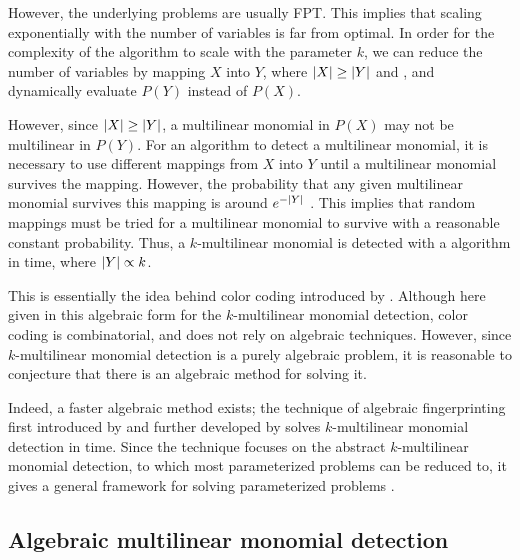 However, the underlying problems are usually FPT. This implies that scaling exponentially 
with the number of variables is far from optimal. In order for the complexity of the algorithm to scale 
with the parameter $k$, we can reduce the number of variables by mapping $X$ into $Y$, where 
${\left\vert X\right\vert} \geq {\left\vert Y\right\vert}$ and
, and dynamically evaluate $P(Y)$ instead of
$P(X)$. 

However, since ${\left\vert X\right\vert} \geq {\left\vert Y\right\vert}$, a multilinear monomial in $P(X)$ may not be multilinear in $P(Y)$. 
For an algorithm to detect a multilinear monomial, it is necessary to use different mappings 
from $X$ into $Y$ until a multilinear monomial survives the mapping. However, the probability 
that any given multilinear monomial survives this mapping is around $e^{-{\left\vert Y\right\vert}}$ \cite{KouWil15}.
This implies that  random mappings must be tried for a
multilinear monomial to survive with a reasonable constant probability. Thus, a
$k$-multilinear monomial is detected with a 
 algorithm in  time, where ${\left\vert Y\right\vert} \propto k$.

This is essentially the idea behind color coding introduced by \citeauthor{Alon95} \cite{Alon95}. 
Although here given in this algebraic form for the $k$-multilinear monomial detection, 
color coding is combinatorial, and does not rely on algebraic techniques. 
However, since $k$-multilinear monomial detection is a purely algebraic problem, it is reasonable to 
conjecture that there is an algebraic method for solving it.

Indeed, a faster algebraic method exists; the technique of algebraic fingerprinting 
first introduced by \citeauthor{Koutis08} \cite{Koutis08} and 
further developed by \citeauthor{Williams09} \cite{Williams09} 
solves $k$-multilinear monomial detection in  time. 
Since the technique focuses on the abstract $k$-multilinear monomial detection, to which 
most parameterized problems can be reduced to, it gives a general framework for 
solving parameterized problems \cite{KouWil15}.

\subsection{Algebraic multilinear monomial detection}

